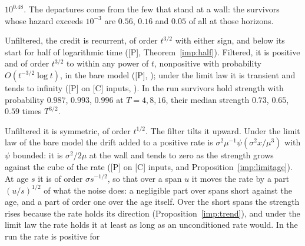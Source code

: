 \begin{description}
$10^{0.48}$. The departures come from the few that stand at a wall: the
survivors whose hazard exceeds $10^{-3}$ are $0.56$, $0.16$ and
$0.05$ of all at those horizons.
\item[The strength.] Unfiltered, the credit is recurrent, of order
$t^{3/2}$ with either sign, and below its start for half of logarithmic
time ([P], Theorem~\ref{imp:half}). Filtered, it is positive and of order $t^{3/2}$ to
within any power of $t$, nonpositive with probability
$O(t^{-3/2}\log t)$, in the bare model ([P], \cite{GoldenSurvivorship}); under the
limit law it is transient and tends to infinity ([P] on [C] inputs, \cite{GoldenSurvivorship}). In the
run survivors hold strength with probability $0.987$, $0.993$, $0.996$
at $T=4,8,16$, their median strength $0.73$, $0.65$, $0.59$ times
$T^{3/2}$.
\item[The strength's rate.] Unfiltered it is symmetric, of order
$t^{1/2}$. The filter tilts it upward. Under the limit law of the bare
model the drift added to a positive rate is
$\sigma^2\mu^{-1}\psi(\sigma^2x/\mu^3)$ with $\psi$ bounded: it is
$\sigma^2/2\mu$ at the wall and tends to zero as the strength grows
against the cube of the rate ([P] on [C] inputs, \cite{GoldenSurvivorship} and
Proposition~\ref{imp:limitage}). At age $s$ it is of order $\sigma s^{-1/2}$, so that over a
span $u$ it moves the rate by a part $(u/s)^{1/2}$ of what the noise
does: a negligible part over spans short against the age, and a part of
order one over the age itself. Over the short spans the strength rises
because the rate holds its direction (Proposition~\ref{imp:trend}), and under the limit law
the rate holds it at least as long as an unconditioned rate would. In the
run the rate is positive for

\end{description}
